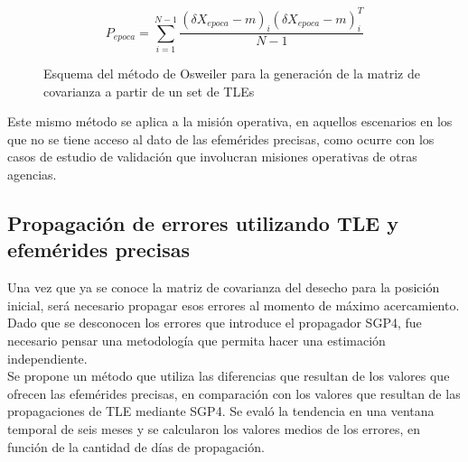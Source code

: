 {\begin{equation}
 P_{epoca}=\sum_{i=1}^{N-1} \frac{(\delta X_{epoca}-m)_{i}(\delta X_{epoca}-m)_{i}^{T}}{N-1}
\end{equation}

\begin{figure}[!h]
\centering
{}
\caption[M\'etodo de Osweiler para la generaci\'on de la matriz de covarianza]{Esquema del m\'etodo de Osweiler para la generaci\'on de la matriz de covarianza a partir de un set de TLEs}
\label{fig:tleosw}
\end{figure}

Este mismo m\'etodo se aplica a la misi\'on operativa, en aquellos escenarios en los que no se tiene acceso al dato de las efem\'erides precisas, como ocurre con los casos de estudio de validaci\'on que involucran misiones operativas de otras agencias.\\

\subsection{Propagaci\'on de errores utilizando TLE y efem\'erides precisas}\label{subsec:tablaprop}
Una vez que ya se conoce la matriz de covarianza del desecho para la posici\'on inicial, ser\'a necesario propagar esos errores al momento de m\'aximo acercamiento.\\
Dado que se desconocen los errores que introduce el propagador SGP4, fue necesario pensar una metodolog\'ia que permita hacer una estimaci\'on independiente.\\
Se propone un m\'etodo que utiliza las diferencias que resultan de los valores que ofrecen las efem\'erides precisas, en comparaci\'on con los valores que resultan de las propagaciones de TLE mediante SGP4. Se eval\'o la tendencia en una ventana temporal de seis meses y se calcularon los valores medios de los errores, en funci\'on de la cantidad de d\'ias de propagaci\'on.

}
